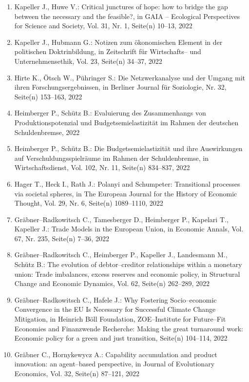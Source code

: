 \begin{enumerate}
	 \item Kapeller J., Huwe V.: Critical junctures of hope: how to bridge the gap between the necessary and the feasible?, in GAIA -- Ecological Perspectives for Science and Society, Vol. 31, Nr. 1, Seite(n) 10--13, 2022
	 \item Kapeller J., Hubmann G.: Notizen zum ökonomischen Element in der politischen Doktrinbildung, in Zeitschrift für Wirtschafts-- und Unternehmensethik, Vol. 23, Seite(n) 34--37, 2022
	 \item Hirte K., Ötsch W., Pühringer S.: Die Netzwerkanalyse und der Umgang mit ihren Forschungsergebnissen, in Berliner Journal für Soziologie, Nr. 32, Seite(n) 153--163, 2022
	 \item Heimberger P., Schütz B.: Evaluierung des Zusammenhangs von Produktionspotenzial und Budgetsemielastizität im Rahmen der deutschen Schuldenbremse, 2022
	 \item Heimberger P., Schütz B.: Die Budgetsemielastizität und ihre Auswirkungen auf Verschuldungsspielräume im Rahmen der Schuldenbremse, in Wirtschaftsdienst, Vol. 102, Nr. 11, Seite(n) 834--837, 2022
	 \item Hager T., Heck I., Rath J.: Polanyi and Schumpeter: Transitional processes via societal spheres, in The European Journal for the History of Economic Thought, Vol. 29, Nr. 6, Seite(n) 1089–1110, 2022
	 \item Gräbner--Radkowitsch C., Tamesberger D., Heimberger P., Kapelari T., Kapeller J.: Trade Models in the European Union, in Economic Annals, Vol. 67, Nr. 235, Seite(n) 7--36, 2022
	 \item Gräbner--Radkowitsch C., Heimberger P., Kapeller J., Landesmann M., Schütz B.: The evolution of debtor--creditor relationships within a monetary union: Trade imbalances, excess reserves and economic policy, in Structural Change and Economic Dynamics, Vol. 62, Seite(n) 262--289, 2022
	 \item Gräbner--Radkowitsch C., Hafele J.: Why Fostering Socio--economic Convergence in the EU Is Necessary for Successful Climate Change Mitigation, in Heinrich Böll Foundation, ZOE--Institute for Future--Fit Economies and Finanzwende Recherche: Making the great turnaround work: Economic policy for a green and just transition, Seite(n) 104--114, 2022
	 \item Gräbner C., Hornykewycz A.: Capability accumulation and product innovation: an agent--based perspective, in Journal of Evolutionary Economics, Vol. 32, Seite(n) 87--121, 2022
\end{enumerate}
